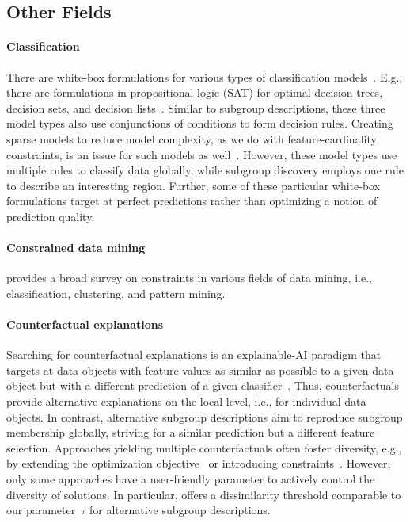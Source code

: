 \documentclass{article}
\theoremstyle{definition}
\begin{document}
\subsection{Other Fields}
\label{sec:csd:related-work:other}

\paragraph{Classification}

There are white-box formulations for various types of classification models~\cite{ignatiev2021reasoning}.
E.g., there are formulations in propositional logic (SAT) for optimal decision trees, decision sets, and decision lists~\cite{narodytska2018learning, shati2021sat, yu2021learning}.
Similar to subgroup descriptions, these three model types also use conjunctions of conditions to form decision rules.
Creating sparse models to reduce model complexity, as we do with feature-cardinality constraints, is an issue for such models as well~\cite{yu2021learning}.
However, these model types use multiple rules to classify data globally, while subgroup discovery employs one rule to describe an interesting region.
Further, some of these particular white-box formulations target at perfect predictions rather than optimizing a notion of prediction quality.

\paragraph{Constrained data mining}

\cite{grossi2017survey} provides a broad survey on constraints in various fields of data mining, i.e., classification, clustering, and pattern mining.

\paragraph{Counterfactual explanations}

Searching for counterfactual explanations is an explainable-AI paradigm that targets at data objects with feature values as similar as possible to a given data object but with a different prediction of a given classifier~\cite{guidotti2022counterfactual}.
Thus, counterfactuals provide alternative explanations on the local level, i.e., for individual data objects.
In contrast, alternative subgroup descriptions aim to reproduce subgroup membership globally, striving for a similar prediction but a different feature selection.
Approaches yielding multiple counterfactuals often foster diversity, e.g., by extending the optimization objective~\cite{mothilal2020explaining} or introducing constraints~\cite{karimi2020model, mohammadi2021scaling, russell2019efficient}.
However, only some approaches have a user-friendly parameter to actively control the diversity of solutions.
In particular, \cite{mohammadi2021scaling} offers a dissimilarity threshold comparable to our parameter~$\tau$ for alternative subgroup descriptions.
\end{document}
